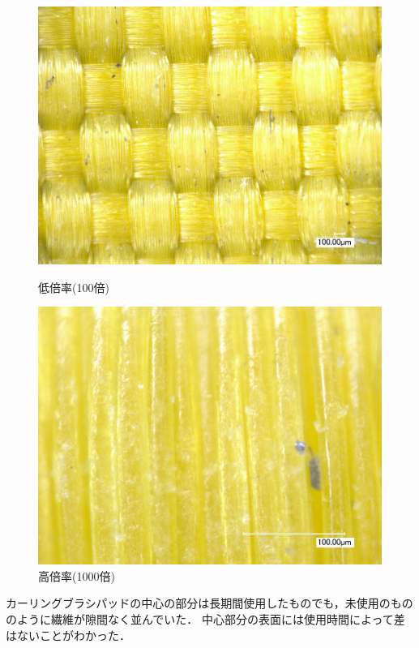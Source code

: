 \documentclass[main]{subfiles}
\begin{document}
\begin{itemize}
    \begin{figure}[H]
        \centering
        \begin{minipage}[htbp]{0.45\linewidth}
            \centering
            \includegraphics[keepaspectratio, width=0.8\linewidth]{figures/中心/カーリングパッド長期低倍率.jpg}
            \caption{低倍率(100倍)}
            \label{fig:label}
        \end{minipage}
        \begin{minipage}[htbp]{0.45\linewidth}
            \centering
            \includegraphics[keepaspectratio, width=0.8\linewidth]{figures/中心/カーリングパッド長期.jpg}
            \caption{高倍率(1000倍)}
            \label{fig:label}
        \end{minipage}
    \end{figure}
\end{itemize}

カーリングブラシパッドの中心の部分は長期間使用したものでも，未使用のもののように繊維が隙間なく並んでいた．
中心部分の表面には使用時間によって差はないことがわかった．
\end{document}
